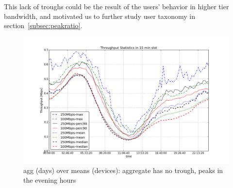 This lack of troughs could be the result of the users' behavior in higher tier bandwidth, and motivated us  to further study user taxonomy in section~\ref{subsec:peakratio}.

\begin{figure}[ht!]
\begin{minipage}{\linewidth}
  \centering
  \includegraphics[width=\linewidth]{figures/describe-total-throughput-per-day[replace].png}
  \caption{agg (days) over means (devices): aggregate has no trough, peaks in the evening hours}
  \label{fig:TS-data-rate-daily}
\end{minipage}
\end{figure}